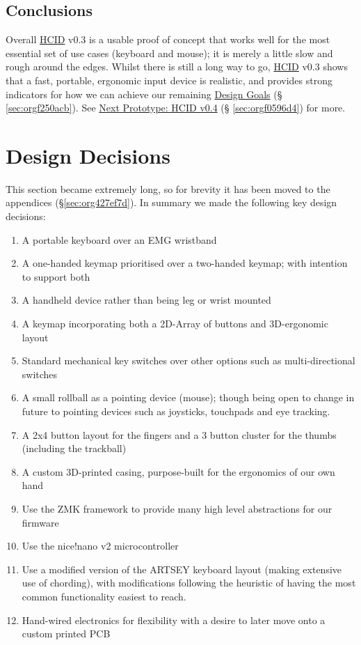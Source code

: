\documentclass[logo,bsc,singlespacing,parskip]{infthesis}
\begin{document}
\section{Conclusions}
\label{sec:orgc11c21e}
Overall \hyperref[org0c83164]{HCID} v0.3 is a usable proof of concept that works well for the most essential set of use cases (keyboard and mouse); it is merely a little slow and rough around the edges.
Whilst there is still a long way to go, \hyperref[org0c83164]{HCID} v0.3 shows that a fast, portable, ergonomic input device is realistic, and provides strong indicators for how we can achieve our remaining \hyperref[sec:orgf250acb]{Design Goals} (§ \ref{sec:orgf250acb}). See \hyperref[sec:orgf0596d4]{Next Prototype: HCID v0.4} (§ \ref{sec:orgf0596d4}) for more.
\chapter{Design Decisions}
\label{sec:org70f081f}
This section became extremely long, so for brevity it has been moved to the appendices (\S \ref{sec:org427ef7d}).
In summary we made the following key design decisions:
\begin{enumerate}
\item A portable keyboard over an EMG wristband
\item A one-handed keymap prioritised over a two-handed keymap; with intention to support both
\item A handheld device rather than being leg or wrist mounted
\item A keymap incorporating both a 2D-Array of buttons and 3D-ergonomic layout
\item Standard mechanical key switches over other options such as multi-directional switches
\item A small rollball as a pointing device (mouse); though being open to change in future to pointing devices such as joysticks, touchpads and eye tracking.
\item A 2x4 button layout for the fingers and a 3 button cluster for the thumbs (including the trackball)
\item A custom 3D-printed casing, purpose-built for the ergonomics of our own hand
\item Use the ZMK framework \autocite{ZMKFirmware} to provide many high level abstractions for our firmware
\item Use the nice!nano v2 microcontroller \autocite{NiceNanoNice}
\item Use a modified version of the ARTSEY keyboard layout \autocite{ARTSEYEasyFast} (making extensive use of chording), with modifications following the heuristic of having the most common functionality easiest to reach.
\item Hand-wired electronics for flexibility with a desire to later move onto a custom printed PCB
\end{enumerate}
\end{document}
